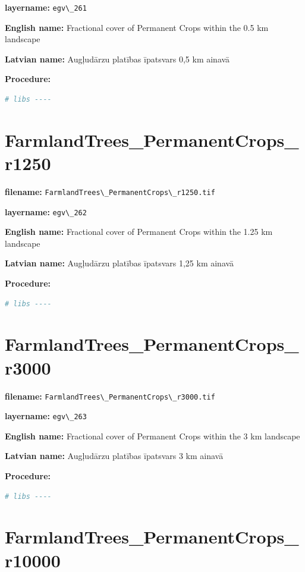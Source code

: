 \documentclass[
]{book}
\newcommand{\passthrough}[1]{#1}
\begin{document}
\textbf{layername:} \passthrough{\lstinline!egv\_261!}

\textbf{English name:} Fractional cover of Permanent Crops within the 0.5 km landscape

\textbf{Latvian name:} Augļudārzu platības īpatsvars 0,5 km ainavā

\textbf{Procedure:}

\begin{lstlisting}[language=R]
# libs ----
\end{lstlisting}

\section{FarmlandTrees\_PermanentCrops\_r1250}\label{ch06.262}

\textbf{filename:} \passthrough{\lstinline!FarmlandTrees\_PermanentCrops\_r1250.tif!}

\textbf{layername:} \passthrough{\lstinline!egv\_262!}

\textbf{English name:} Fractional cover of Permanent Crops within the 1.25 km landscape

\textbf{Latvian name:} Augļudārzu platības īpatsvars 1,25 km ainavā

\textbf{Procedure:}

\begin{lstlisting}[language=R]
# libs ----
\end{lstlisting}

\section{FarmlandTrees\_PermanentCrops\_r3000}\label{ch06.263}

\textbf{filename:} \passthrough{\lstinline!FarmlandTrees\_PermanentCrops\_r3000.tif!}

\textbf{layername:} \passthrough{\lstinline!egv\_263!}

\textbf{English name:} Fractional cover of Permanent Crops within the 3 km landscape

\textbf{Latvian name:} Augļudārzu platības īpatsvars 3 km ainavā

\textbf{Procedure:}

\begin{lstlisting}[language=R]
# libs ----
\end{lstlisting}

\section{FarmlandTrees\_PermanentCrops\_r10000}\label{ch06.264}
\end{document}
